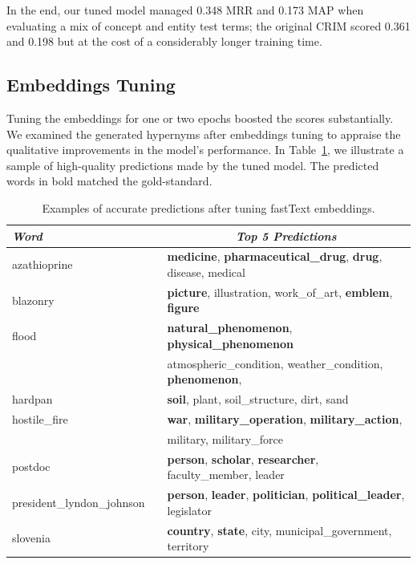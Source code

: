 In the end, our tuned model managed 0.348 \ac{MRR} and 0.173 \ac{MAP} when evaluating a mix of concept and entity test terms; the original CRIM scored 0.361 and 0.198 but at the cost of a considerably longer training time.

\subsection{Embeddings Tuning}
Tuning the embeddings for one or two epochs boosted the scores substantially.  We examined the generated hypernyms after embeddings tuning to appraise the qualitative improvements in the model's performance.  In Table~\ref{tab:ft_tuned_predictions}, we illustrate a sample of high-quality predictions made by the tuned model.  The predicted words in bold matched the gold-standard.
\begin{table}\centering
    \begin{tabular}{@{}lcl@{}} \toprule
    \textit{Word} & \phantom{a} & \multicolumn{1}{c}{\textit{Top 5 Predictions}} \\ \midrule
    azathioprine && \textbf{medicine}, \textbf{pharmaceutical\_drug}, \textbf{drug}, disease, medical\\
    blazonry && \textbf{picture}, illustration, work\_of\_art, \textbf{emblem}, \textbf{figure}\\
    flood && \textbf{natural\_phenomenon}, \textbf{physical\_phenomenon}\\
    && atmospheric\_condition, weather\_condition, \textbf{phenomenon},\\
    hardpan && \textbf{soil}, plant, soil\_structure, dirt, sand\\
    hostile\_fire && \textbf{war}, \textbf{military\_operation}, \textbf{military\_action},\\ 
    && military, military\_force\\
    postdoc && \textbf{person}, \textbf{scholar}, \textbf{researcher}, faculty\_member, leader\\
    president\_lyndon\_johnson && \textbf{person}, \textbf{leader}, \textbf{politician}, \textbf{political\_leader}, legislator\\
    slovenia && \textbf{country}, \textbf{state}, city, municipal\_government, territory\\    
    \bottomrule
    \end{tabular}
    \caption{Examples of accurate predictions after tuning fastText embeddings.}\label{tab:ft_tuned_predictions}
\end{table}

